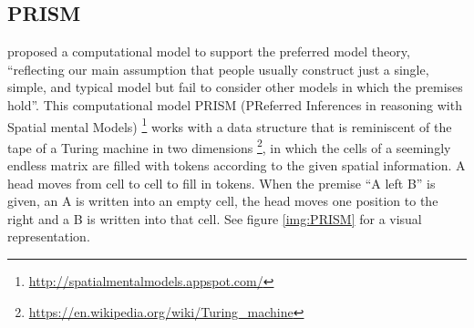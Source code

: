 \documentclass[hidelinks]{scrartcl}
\begin{document}
\subsection{PRISM}\label{sec:PRISM}
\cite{Ragni.2013} proposed a computational model to support the preferred model theory, ``reflecting
our main assumption that people usually construct just a single, simple, and typical model but fail to consider other models in which the premises hold''. This computational model PRISM (PReferred Inferences in reasoning with Spatial mental Models) \footnote{\url{http://spatialmentalmodels.appspot.com/}} works with a data structure that is reminiscent of the tape of a Turing machine in two dimensions \footnote{\url{https://en.wikipedia.org/wiki/Turing_machine}}, in which the cells of a seemingly endless matrix are filled with tokens according to the given spatial information. A head moves from cell to cell to fill in tokens. When the premise ``A left B'' is given, an A is written into an empty cell, the head moves one position to the right and a B is written into that cell. See figure \ref{img:PRISM} for a visual representation. 
\end{document}
